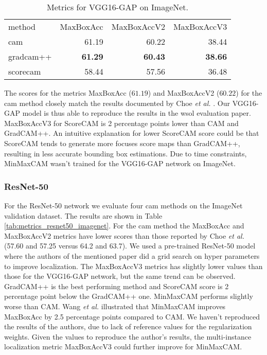 \begin{table}[ht]
\centering
\begin{tabular}{lrrr}
\toprule
method & MaxBoxAcc & MaxBoxAccV2 & MaxBoxAccV3 \\
\cmidrule(lr){1-1} \cmidrule(lr){2-4}
cam & 61.19 & 60.22 & 38.44 \\
gradcam++ & \bfseries 61.29 & \bfseries 60.43 & \bfseries 38.66 \\
scorecam & 58.44 & 57.56 & 36.48 \\
\bottomrule
\end{tabular}
\caption[Metrics for VGG16-GAP on ImageNet]{Metrics for VGG16-GAP on ImageNet.}
\label{tab:metrics_vgg16_gap_imagenet}
\end{table}

The scores for the metrics MaxBoxAcc ($61.19$) and MaxBoxAccV2 ($60.22$) for the \acrshort{cam} method closely match the results documented by Choe \textit{et al.} \cite{choe2020evaluating}. Our VGG16-GAP model is thus able to reproduce the results in the \acrshort{wsol} evaluation paper. MaxBoxAccV3 for ScoreCAM is 2 percentage points lower than CAM and GradCAM++. An intuitive explanation for lower ScoreCAM score could be that ScoreCAM tends to generate more focuses score maps than GradCAM++, resulting in less accurate bounding box estimations. Due to time constraints, MinMaxCAM wasn't trained for the VGG16-GAP network on ImageNet.

\subsubsection{ResNet-50}

For the ResNet-50 network we evaluate four \acrshort{cam} methods on the ImageNet validation dataset. The results are shown in Table \ref{tab:metrics_resnet50_imagenet}. For the \acrshort{cam} method the MaxBoxAcc and MaxBoxAccV2 metrics have lower scores than those reported by Choe \textit{et al.} (57.60 and 57.25 versus 64.2 and 63.7). We used a pre-trained ResNet-50 model where the authors of the mentioned paper did a grid search on hyper parameters to improve localization. The MaxBoxAccV3 metrics has slightly lower values than those for the VGG16-GAP network, but the same trend can be observed. GradCAM++ is the best performing method and ScoreCAM score is 2 percentage point below the GradCAM++ one. MinMaxCAM performs slightly worse than CAM. Wang \textit{et al.} \cite{wang2021minmaxcam} illustrated that MinMaxCAM improves MaxBoxAcc by 2.5 percentage points compared to CAM. We haven't reproduced the results of the authors, due to lack of reference values for the regularization weights. Given the values to reproduce the author's results, the multi-instance localization metric MaxBoxAccV3 could further improve for MinMaxCAM.

